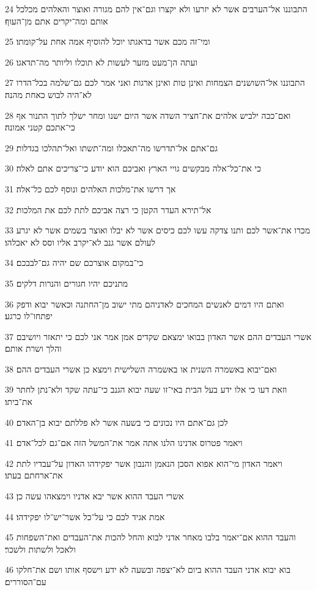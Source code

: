 \par 24 התבוננו אל־הערבים אשר לא יזרעו ולא יקצרו וגם־אין להם מגורה ואוצר והאלהים מכלכל אותם ומה־יקרים אתם מן־העוף׃
\par 25 ומי־זה מכם אשר בדאגתו יוכל להוסיף אמה אחת על־קומתו׃
\par 26 ועתה הן־מעט מזער לעשות לא תוכלו וליותר מה־תדאגו׃
\par 27 התבוננו אל־השושנים הצמחות ואינן טות ואינן ארגות ואני אמר לכם גם־שלמה בכל־הדרו לא־היה לבוש כאחת מהנה׃
\par 28 ואם־ככה ילביש אלהים את־חציר השדה אשר היום ישנו ומחר ישלך לתוך התנור אף כי־אתכם קטני אמונה׃
\par 29 גם־אתם אל־תדרשו מה־תאכלו ומה־תשתו ואל־תהלכו בגדלות׃
\par 30 כי את־כל־אלה מבקשים גויי הארץ ואביכם הוא יודע כי־צריכים אתם לאלה׃
\par 31 אך דרשו את־מלכות האלהים ונוסף לכם כל־אלה׃
\par 32 אל־תירא העדר הקטן כי רצה אביכם לתת לכם את המלכות׃
\par 33 מכרו את־אשר לכם ותנו צדקה עשו לכם כיסים אשר לא יבלו ואוצר בשמים אשר לא יגרע לעולם אשר גנב לא־יקרב אליו וסס לא יאכלהו׃
\par 34 כי־במקום אוצרכם שם יהיה גם־לבבכם׃
\par 35 מתניכם יהיו חגורים והנרות דלקים׃
\par 36 ואתם היו דמים לאנשים המחכים לאדניהם מתי ישוב מן־החתנה וכאשר יבוא ודפק יפתחו־לו כרגע׃
\par 37 אשרי העבדים ההם אשר האדון בבואו ימצאם שקדים אמן אמר אני לכם כי יתאזר ויושיבם והלך ושרת אותם׃
\par 38 ואם־יבוא באשמרה השנית או באשמרה השלישית וימצא כן אשרי העבדים ההם׃
\par 39 וזאת דעו כי אלו ידע בעל הבית באי־זו שעה יבוא הגנב כי־עתה שקד ולא־נתן לחתר את־ביתו׃
\par 40 לכן גם־אתם היו נכונים כי בשעה אשר לא פללתם יבוא בן־האדם׃
\par 41 ויאמר פטרוס אדנינו הלנו אתה אמר את־המשל הזה אם־גם לכל־אדם׃
\par 42 ויאמר האדון מי־הוא אפוא הסכן הנאמן והנבון אשר יפקידהו האדון על־עבדיו לתת את־ארחתם בעתו׃
\par 43 אשרי העבד ההוא אשר יבא אדניו וימצאהו עשה כן׃
\par 44 אמת אגיד לכם כי על־כל אשר־יש־לו יפקידהו׃
\par 45 והעבד ההוא אם־יאמר בלבו מאחר אדני לבוא והחל להכות את־העבדים ואת־השפחות ולאכל ולשתות ולשכר׃
\par 46 בוא יבוא אדני העבד ההוא ביום לא־יצפה ובשעה לא ידע וישסף אותו ושם את־חלקו עם־הסוררים׃
